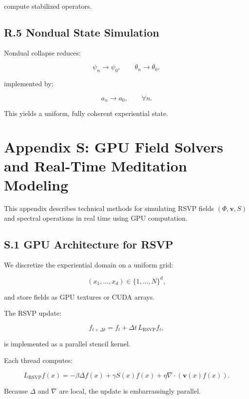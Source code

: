 \documentclass[12pt]{article}
\begin{document}
compute stabilized operators.


\subsection*{R.5 Nondual State Simulation}

Nondual collapse reduces:

\[
\psi_n \to \psi_0,
\qquad
\theta_n \to \theta_0,
\]

implemented by:

\[
a_n \to a_0, \qquad \forall n.
\]

This yields a uniform, fully coherent experiential state.


\section*{Appendix S: GPU Field Solvers and Real-Time Meditation Modeling}

This appendix describes technical methods for simulating RSVP fields
$(\Phi,\mathbf{v},S)$ and spectral operations in real time using GPU computation.

\subsection*{S.1 GPU Architecture for RSVP}

We discretize the experiential domain on a uniform grid:

\[
(x_1,\ldots,x_d) \in \{1,\ldots,N\}^d,
\]

and store fields as GPU textures or CUDA arrays.

The RSVP update:

\[
f_{t+\Delta t}
=
f_t
+
\Delta t\, L_{\text{RSVP}} f_t,
\]

is implemented as a parallel stencil kernel.

Each thread computes:

\[
L_{\text{RSVP}} f(x) =
-\beta \Delta f(x)
+ \gamma S(x) f(x)
+ \eta \nabla \cdot (\mathbf{v}(x) f(x)).
\]

Because $\Delta$ and $\nabla$ are local, the update is embarrassingly parallel.
\end{document}
